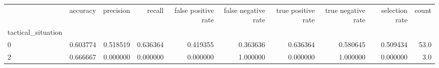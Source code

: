 \begin{tabular}{lrrrrrrrrr}
\toprule
{} &  accuracy &  precision &    recall &  false positive rate &  false negative rate &  true positive rate &  true negative rate &  selection rate &  count \\
tactical\_situation &           &            &           &                      &                      &                     &                     &                 &        \\
\midrule
0                  &  0.603774 &   0.518519 &  0.636364 &             0.419355 &             0.363636 &            0.636364 &            0.580645 &        0.509434 &   53.0 \\
2                  &  0.666667 &   0.000000 &  0.000000 &             0.000000 &             1.000000 &            0.000000 &            1.000000 &        0.000000 &    3.0 \\
\bottomrule
\end{tabular}
